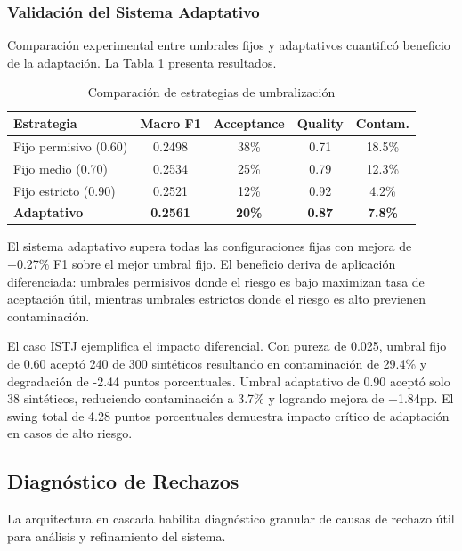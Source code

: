 \subsubsection*{Validación del Sistema Adaptativo}

Comparación experimental entre umbrales fijos y adaptativos cuantificó beneficio de la adaptación. La Tabla \ref{tab:adaptive_validation} presenta resultados.

\begin{table}[h]
\centering
\caption{Comparación de estrategias de umbralización}
\label{tab:adaptive_validation}
\begin{tabular}{lcccc}
\hline
Estrategia & Macro F1 & Acceptance & Quality & Contam. \\
\hline
Fijo permisivo (0.60) & 0.2498 & 38\% & 0.71 & 18.5\% \\
Fijo medio (0.70) & 0.2534 & 25\% & 0.79 & 12.3\% \\
Fijo estricto (0.90) & 0.2521 & 12\% & 0.92 & 4.2\% \\
\textbf{Adaptativo} & \textbf{0.2561} & \textbf{20\%} & \textbf{0.87} & \textbf{7.8\%} \\
\hline
\end{tabular}
\end{table}

El sistema adaptativo supera todas las configuraciones fijas con mejora de +0.27\% F1 sobre el mejor umbral fijo. El beneficio deriva de aplicación diferenciada: umbrales permisivos donde el riesgo es bajo maximizan tasa de aceptación útil, mientras umbrales estrictos donde el riesgo es alto previenen contaminación.

El caso ISTJ ejemplifica el impacto diferencial. Con pureza de 0.025, umbral fijo de 0.60 aceptó 240 de 300 sintéticos resultando en contaminación de 29.4\% y degradación de -2.44 puntos porcentuales. Umbral adaptativo de 0.90 aceptó solo 38 sintéticos, reduciendo contaminación a 3.7\% y logrando mejora de +1.84pp. El swing total de 4.28 puntos porcentuales demuestra impacto crítico de adaptación en casos de alto riesgo.

\subsection{Diagnóstico de Rechazos}
\label{subsec:diagnostico}

La arquitectura en cascada habilita diagnóstico granular de causas de rechazo útil para análisis y refinamiento del sistema.

